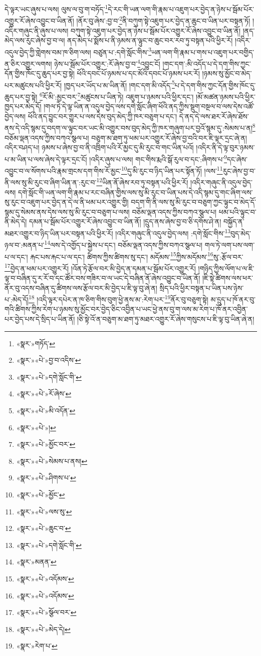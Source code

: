 དེ་ལྟར་ཡང་ཞུས་པ་ལས། ལུས་ལ་བུ་ག་བཏོད་\footnote{«སྣར་»གཏོད་}དེ་རང་གི་ཡན་ལག་གི་རྣམ་པ་འཇུག་པར་བྱེད་ན་ཉེས་པ་སྦོམ་པོར་འགྱུར་རོ་ཞེས་འབྱུང་བ་ཡིན་ནོ། །ནོར་བུ་ཞེས་:བྱ་བ་\footnote{«སྣར་»«པེ་»བྱ་བ་འདིས་}ནི་བཀུག་སྟེ་འཇུག་པར་བྱེད་ན་ཆུང་བ་ཡིན་པར་བསྟན་ཏོ། །འདིར་གཞུང་ནི་ཞུས་པ་ལས། བཀུག་སྟེ་འཇུག་པར་བྱེད་ན་ཉེས་པ་སྦོམ་པོར་འགྱུར་རོ་ཞེས་འབྱུང་བ་ཡིན་ནོ། །ནད་མེད་ལས་རུང་ཞེས་བྱ་བ་ལ། ནད་མེད་པ་སྨོས་པ་ནི་ཉམས་ན་ལྟུང་བ་ཆུང་བར་རབ་ཏུ་བསྟན་པའི་ཕྱིར་རོ། །འདིར་འདུལ་བྱེད་ཀྱི་གླེགས་བམ་ཁ་ཅིག་ལས། བཙུན་པ་:དགེ་སློང་གིས་\footnote{«སྣར་»«པེ་»དགེ་སློང་གི་}ཡན་ལག་གི་རྣམ་པ་གས་པ་འཇུག་པར་བགྱིད་ན་ཅིར་འགྱུར་ལགས། ཉེས་པ་སྦོམ་པོར་འགྱུར་:རོ་ཞེས་བྱ་བ་\footnote{«སྣར་»«པེ་»རོ་ཞེས་}འབྱུང་ངོ། །གང་དག་:མི་འདོད་པ་དེ་དག་གིས་ཀྱང་དོན་གྱིས་ཁོང་དུ་ཆུད་པར་བྱ་སྟེ། ཕོའི་དབང་པོ་ཉམས་པ་དང་མོའི་དབང་པོ་ཉམས་པར་རོ། །ཉམས་སུ་མྱོང་བ་མེད་པར་མཚུངས་པའི་ཕྱིར་རོ། །ཁྱད་པར་ཡོད་པ་མ་ཡིན་ནོ། །གང་དག་མི་འདོད་\footnote{«སྣར་»«པེ་»མི་འདོན་}པ་དེ་དག་གིས་ཀྱང་དོན་གྱིས་ཁོང་དུ་ཆུད་པར་བྱ་སྟེ། \footnote{«སྣར་»«པེ་»།  }རོ་མི་:མྱང་བར་\footnote{«སྣར་»«པེ་»མྱོང་བར་}མཚུངས་པ་ཡིན་ཏེ། འཇུག་པ་ཉམས་པའི་ཕྱིར་དང་། །མོ་མཚན་ཉམས་པའི་ཕྱིར་ཁྱད་པར་མེད་དོ། །གལ་ཏེ་དེ་ལྟ་ཡིན་ན་འདུལ་བྱེད་ལས་དགེ་སློང་ཞིག་ཕོའི་ནད་ཀྱིས་སྡུག་བསྔལ་བ་ལས་དེས་འཚོ་བྱེད་ལས། ཕོའི་ནད་བྱུང་བར་གྱུར་པ་ལས་དེས་བུད་མེད་ཀྱི་ཁར་བཅུག་པ་དང་། དེ་ནད་དེ་ལས་ཐར་རོ་ཞེས་ཐོས་ནས་དེ་འདི་སྙམ་དུ་བདག་ལ་ལྟུང་བར་ཡང་མི་འགྱུར་བས་བུད་མེད་ཀྱི་ཁར་གཞུག་པར་བྱའོ་སྙམ་དུ་:སེམས་པ་ན།\footnote{«སྣར་»«པེ་»སེམས་པ་ནས།} བཅོམ་ལྡན་འདས་ཀྱིས་བཀའ་སྩལ་པ། བཅུག་མ་ཐག་ཏུ་ཕམ་པར་འགྱུར་རོ་ཞེས་བྱ་བའི་བར་ཇི་ལྟར་དྲང་ཞེ་ན། འདིར་བཤད་པ། ཉམས་པ་ཞེས་བྱ་བ་ནི་འཁྲིག་པའི་རོ་མྱང་དུ་མི་རུང་བ་གང་ཡིན་པའོ། །འདིར་ནི་དེ་ལྟ་བུར་ཉམས་པ་མ་ཡིན་པ་ལས་ཞེས་དེ་ལྟར་དྲང་ངོ། །འདིར་ཞུས་པ་ལས། གང་གིས་རྨའི་སྒོ་རུལ་བ་དང་:ཞིགས་པ་\footnote{«སྣར་»«པེ་»ཤིགས་པ་}དང་ཞེས་འབྱུང་བ་ལ་སོགས་པའི་རྣམ་གྲངས་དག་གིས་རོ་མྱང་\footnote{«སྣར་»«པེ་»མྱོང་}དུ་མི་རུང་བ་ཉིད་ཡིན་པར་སྟོན་ཏོ། །ལས་\footnote{«སྣར་»«པེ་»ལས་སུ་}རུང་ཞེས་བྱ་བ་ནི་ལས་སུ་མི་རུང་བ་ཞིག་ཡིན་ན་:རུང་བ་\footnote{«སྣར་»«པེ་»ཆུང་བ་}ཡིན་ནོ་ཞེས་རབ་ཏུ་བསྟན་པའི་ཕྱིར་རོ། །འདིར་གཞུང་ནི་འདུལ་བྱེད་ལས། དགེ་སློང་གི་ཡན་ལག་གི་རྣམ་པ་རང་བཞིན་གྱིས་ལས་སུ་མི་རུང་བ་ཡིན་པས་དེ་འདི་སྙམ་དུ་གང་ཞིག་ལས་སུ་རུང་བ་འཇུག་པར་བྱེད་ན་དེ་ལ་ནི་ཕམ་པར་འགྱུར་གྱི། བདག་གི་ནི་ལས་སུ་མི་རུང་བ་བཅུག་ཀྱང་ལྟུང་བ་མེད་དོ་སྙམ་དུ་སེམས་ནས་དེས་ལས་སུ་མི་རུང་བ་བཅུག་པ་ལས། བཅོམ་ལྡན་འདས་ཀྱིས་བཀའ་སྩལ་པ། ཕམ་པའི་ལྟུང་བ་ནི་མེད་དེ། དམན་པ་སྦོམ་པོར་འགྱུར་རོ་ཞེས་འབྱུང་བ་ཡིན་ནོ། །དྲུད་ནས་ཞེས་བྱ་བ་ཅི་དགོས་ཤེ་ན། བསྐྱོད་ན་མཐར་འགྱུར་བ་ཉིད་ཡིན་པར་བསྟན་པའི་ཕྱིར་རོ། །འདིར་གཞུང་ནི་འདུལ་བྱེད་ལས། :དགེ་སློང་གིས་\footnote{«སྣར་»«པེ་»དགེ་སློང་གི་}བུད་མེད་ཉལ་བ་:མནན་པ་\footnote{«སྣར་»མནན་}ལས་དེ་འགྱོད་པ་སྐྱེས་པ་དང་། བཅོམ་ལྡན་འདས་ཀྱིས་བཀའ་སྩལ་པ། གལ་ཏེ་ལག་པས་ལག་པ་ལ་དང་། རྐང་པས་རྐང་པ་ལ་དང་། ཚིགས་ཀྱིས་ཚིགས་སུ་དང་། མདོམས་\footnote{«སྣར་»«པེ་»འདོམས་}ཀྱིས་མདོམས་\footnote{«སྣར་»«པེ་»འདོམས་}སུ་:རྩོལ་བར་\footnote{«སྣར་»«པེ་»སྩོལ་བར་}བྱེད་ན་ཕམ་པར་འགྱུར་རོ། །འོན་ཏེ་རྩོལ་བར་མི་བྱེད་ན་དམན་པ་སྦོམ་པོར་འགྱུར་རོ། །གཉིད་ཀྱིས་ལོག་པ་ལ་ཇི་ལྟ་བ་བཞིན་དུ་ར་རོ་བ་དང་ཚོར་བས་གཟིར་བ་ལ་ཡང་དེ་བཞིན་ནོ་ཞེས་འབྱུང་བ་ཡིན་ནོ། །ཇི་སྟེ་ཚིགས་ལས་ཕར་ནོར་བུ་འདས་བཞིན་དུ་ཚིགས་ལས་རྩོལ་བར་མི་བྱེད་པ་ཇི་ལྟ་བུ་ཞེ་ན། སྲིད་པའི་ཕྱིར་བསྟན་པ་ཡིན་པས་ཉེས་པ་:མེད་དོ།\footnote{«སྣར་»«པེ་»མེད་དེ།} །འདི་ལྟར་དཔེར་ན་ཁ་ཅིག་གིས་བུག་ཕྱེ་ནས་མ་:རེག་པར་\footnote{«སྣར་»རེག་པ་}ནོར་བུ་བཅུག་སྟེ། མ་དྲུད་པ་ཁོ་ནར་བུ་གའི་ཚིགས་ཀྱིས་རེག་པ་ཉམས་སུ་མྱོང་བར་བྱེད་ཅིང་འབྱིན་པ་ཡང་ཕྱེ་ནས་བུ་ག་ལས་མ་རེག་པ་ཁོ་ནར་འབྱིན་པར་བྱེད་པས་དེ་སྲིད་པ་ཡིན་ནོ། །ཅི་སྟེ་འོ་ན་བཅུག་མ་ཐག་ཏུ་མཐར་འགྱུར་རོ་ཞེས་གསུངས་པ་ཇི་ལྟ་བུ་ཡིན་ཞེ་ན། 
